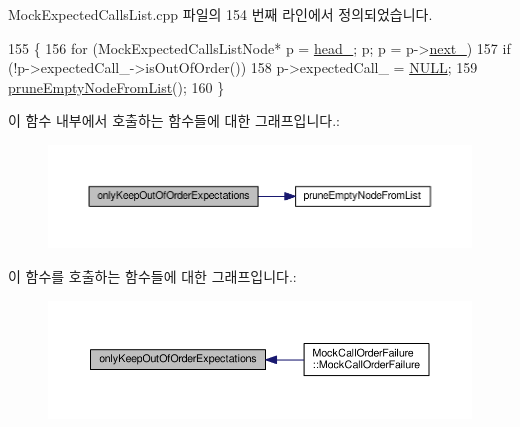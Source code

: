 Mock\+Expected\+Calls\+List.\+cpp 파일의 154 번째 라인에서 정의되었습니다.


\begin{DoxyCode}
155 \{
156     \textcolor{keywordflow}{for} (MockExpectedCallsListNode* p = \hyperlink{class_mock_expected_calls_list_a18290c3c0a206882dd8e0d9f446e2fe6}{head\_}; p; p = p->\hyperlink{class_mock_expected_calls_list_1_1_mock_expected_calls_list_node_aaae452a372ae14c06a6d5d252df73725}{next\_})
157         \textcolor{keywordflow}{if} (!p->expectedCall\_->isOutOfOrder())
158             p->expectedCall\_ = \hyperlink{openavb__types__base__pub_8h_a070d2ce7b6bb7e5c05602aa8c308d0c4}{NULL};
159     \hyperlink{class_mock_expected_calls_list_aeb4c1dd9901800365e942770b132c94b}{pruneEmptyNodeFromList}();
160 \}
\end{DoxyCode}


이 함수 내부에서 호출하는 함수들에 대한 그래프입니다.\+:
\nopagebreak
\begin{figure}[H]
\begin{center}
\leavevmode
\includegraphics[width=350pt]{class_mock_expected_calls_list_af78904a7f66b28b2c3d88ddfd5f0479a_cgraph}
\end{center}
\end{figure}




이 함수를 호출하는 함수들에 대한 그래프입니다.\+:
\nopagebreak
\begin{figure}[H]
\begin{center}
\leavevmode
\includegraphics[width=350pt]{class_mock_expected_calls_list_af78904a7f66b28b2c3d88ddfd5f0479a_icgraph}
\end{center}
\end{figure}


